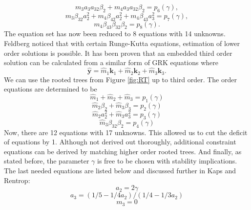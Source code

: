 \documentclass{ansconf}
\numberwithin{equation}{section}
\begin{document}
\begin{equation}
   m_3a_3a_{32}\beta_2 + m_4a_3a_{32}\beta_2 = p_6\left(\gamma\right),
\end{equation}
\begin{equation}
   m_3\beta_{32}a_2^2 + m_4\beta_{42}a_2^2 + m_4\beta_{43}a_3^2 = p_7\left(\gamma\right),
\end{equation}
\begin{equation}
   m_4\beta_{43}\beta_{32}\beta_2 = p_8\left(\gamma\right).
\end{equation}
The equation set has now been reduced to 8 equations with 14 unknowns. Feldberg noticed that with certain Runge-Kutta equations, estimation of lower order solutions is possible. It has been proven that an embedded third order solution can be calculated from a similar form of GRK equations where
\begin{equation}
    \hat{\mathbf{y}} = \hat{m}_1\mathbf{k}_1 + \hat{m}_2\mathbf{k}_2 + \hat{m}_3\mathbf{k}_3.
\end{equation}
We can use the rooted trees from Figure \ref{fig:RT} up to third order. The order equations are determined to be
\begin{equation}
     \hat{m}_1 + \hat{m}_2 + \hat{m}_3 = p_1\left(\gamma\right)
\end{equation}
\begin{equation}
     \hat{m}_2\beta_2 + \hat{m}_3\beta_3 = p_2\left(\gamma\right)
\end{equation}
\begin{equation}
     \hat{m}_2a^2_2 + \hat{m}_3a^2_3 = p_3\left(\gamma\right)
\end{equation}
\begin{equation}
     \hat{m}_3\beta_{32}\beta_2 = p_4\left(\gamma\right)
\end{equation}
Now, there are 12 equations with 17 unknowns. This allowed us to cut the deficit of equations by 1. Although not derived out thoroughly, additional constraint equations can be derived by matching higher order rooted trees.  And finally, as stated before, the parameter $\gamma$ is free to be chosen with stability implications. The last needed equations are listed below and discussed further in Kaps and Rentrop:
\begin{equation}
   a_2 = 2\gamma
\end{equation}
\begin{equation}
    a_3 = \left(1/5 - 1/4a_2\right)/\left(1/4 - 1/3a_2\right)
\end{equation}
\begin{equation}
   m_3 = 0
\end{equation}
\end{document}
